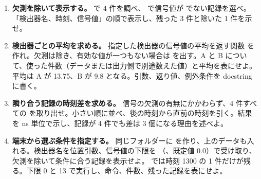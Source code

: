 \begin{enumerate}
\item \textbf{欠測を除いて表示する。}
 で 4 件を調べ、 で信号値が  でない記録を選べ。「検出器名、時刻、信号値」の順で表示し、残った 3 件と除いた 1 件を示せ。

\item \textbf{検出器ごとの平均を求める。}
指定した検出器の信号値の平均を返す関数  を作れ。欠測は除き、有効な値が一つもない場合は  を出す。A と B について、使った件数（データまたは出力側で別途数えた値）と平均を表にせよ。平均は A が 13.75、B が 9.8 となる。引数、返り値、例外条件を docstring に書く。

\item \textbf{隣り合う記録の時刻差を求める。}
信号の欠測の有無にかかわらず、4 件すべての  を取り出せ。小さい順に並べ、後の時刻から直前の時刻を引く。結果 \code{[180, 120, 210]} を ns 単位で示し、記録が 4 件でも差は 3 個になる理由を述べよ。

\item \textbf{端末から選ぶ条件を指定する。}
同じフォルダーに  を作り、上のデータも入れる。検出器名を位置引数、信号値の下限を （、既定値 0.0）で受け取り、欠測を除いて条件に合う記録を表示せよ。 では時刻 1300 の 1 件だけが残る。下限 0 と 13 で実行し、命令、件数、残った記録を表にせよ。

\end{enumerate}
